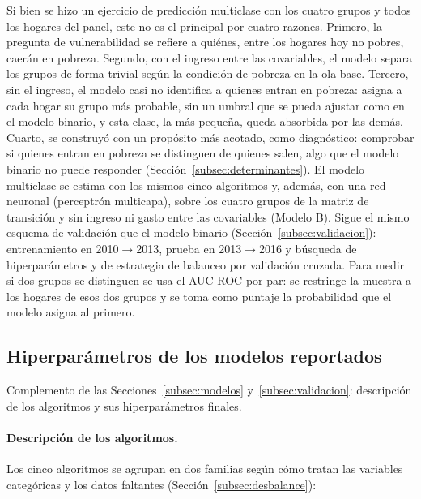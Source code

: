 \documentclass[12pt, letterpaper]{article}
\begin{document}
Si bien se hizo un ejercicio de predicción multiclase con los cuatro
grupos y todos los hogares del panel, este no es el principal por cuatro
razones. Primero, la pregunta de vulnerabilidad se refiere a quiénes,
entre los hogares hoy no pobres, caerán en pobreza. Segundo, con el
ingreso entre las covariables, el modelo separa los grupos de forma
trivial según la condición de pobreza en la ola base. Tercero, sin el
ingreso, el modelo casi no identifica a quienes entran en pobreza:
asigna a cada hogar su grupo más probable, sin un umbral que se pueda
ajustar como en el modelo binario, y esta clase, la más pequeña,
queda absorbida por las demás. Cuarto, se construyó con un propósito
más acotado, como diagnóstico: comprobar si quienes entran en pobreza
se distinguen de quienes salen, algo que el modelo binario no puede
responder (Sección~\ref{subsec:determinantes}).
El modelo multiclase se estima con los mismos cinco algoritmos y, además,
con una red
neuronal (perceptrón multicapa), sobre los cuatro grupos de la matriz de
transición y sin ingreso ni gasto entre las covariables (Modelo B). Sigue
el mismo esquema de validación que el modelo binario
(Sección~\ref{subsec:validacion}): entrenamiento en 2010$\to$2013, prueba
en 2013$\to$2016 y búsqueda de hiperparámetros y de estrategia de
balanceo por validación cruzada. Para medir si dos grupos se distinguen
se usa el AUC-ROC por par: se restringe la muestra a los hogares de esos
dos grupos y se toma como puntaje la probabilidad que el modelo asigna al
primero.





\subsection{Hiperparámetros de los modelos reportados}
\label{apx:hiperparametros}

Complemento de las Secciones~\ref{subsec:modelos} y~\ref{subsec:validacion}:
descripción de los algoritmos y sus hiperparámetros finales.

\paragraph{Descripción de los algoritmos.} Los cinco algoritmos se
agrupan en dos familias según cómo tratan las variables categóricas y los
datos faltantes (Sección~\ref{subsec:desbalance}):
\end{document}
